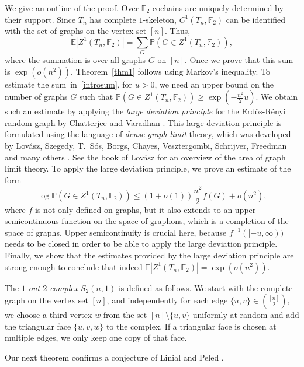 \documentclass[11pt,a4paper]{article}
\theoremstyle{plain}
\theoremstyle{definition}
\begin{document}
We give an outline of the proof. Over $\mathbb{F}_2$ cochains are uniquely determined by their support. Since $T_n$ has complete $1$-skeleton, $C^1(T_n,\mathbb{F}_2)$ can be identified with the set of graphs on the vertex set $[n]$. Thus,
\begin{equation}\label{introsum}\mathbb{E}|Z^1(T_n,\mathbb{F}_2)|=\sum_G \mathbb{P}(G\in Z^1(T_n,\mathbb{F}_2)),\end{equation}
where the summation is over all graphs $G$ on $[n]$. Once we prove that this sum is $\exp(o(n^2))$, Theorem~\ref{thm1} follows using Markov's inequality. To estimate the sum~in~\eqref{introsum}, for $u>0$, we need an upper bound on the number of graphs $G$ such that $\mathbb{P}(G\in Z^1(T_n,\mathbb{F}_2))\ge \exp\left(-\frac{n^2}2 u\right)$. We obtain such an estimate by applying the \emph{large deviation principle} for the Erd\H{o}s-R\'enyi random graph by Chatterjee and Varadhan \cite{chatterjee2011large}. This large deviation principle is formulated using the language of \emph{dense graph limit} theory, which was developed by  Lov\'asz, Szegedy, T.~S\'os,  Borgs, Chayes, Vesztergombi,  Schrijver, Freedman and many others \cite{dl1,dl2,dl3,dl4,dl5,dl6,dl7,dl8,dl9,dl10}.  See the book of Lov\'asz \cite{lovasz2012large} for an overview of the area of graph limit theory. To apply the large deviation principle, we prove an estimate of the form \[\log \mathbb{P}(G\in Z^1(T_n,\mathbb{F}_2))\le (1+o(1))\frac{n^2}2 f(G)+o(n^2),\]
where $f$ is not only defined on graphs, but it also extends to an upper semicontinuous function on the space of graphons, which is a completion of the space of graphs. Upper semicontinuity is crucial here, because $f^{-1}([-u,\infty))$ needs to be closed in order to be able to apply the large deviation principle. Finally, we show that the estimates provided by the large deviation principle are strong enough to conclude that indeed  $\mathbb{E}|Z^1(T_n,\mathbb{F}_2)|=\exp(o(n^2))$.



The \emph{$1$-out $2$-complex} $S_2(n,1)$ is defined as follows. We start with the complete graph on the vertex set $[n]$, and independently for each edge $\{u,v\}\in {{[n]}\choose{2}}$, we choose a third vertex $w$ from the set $[n]\setminus \{u,v\}$ uniformly at random and add the triangular face $\{u,v,w\}$ to the complex. If a triangular face is chosen at multiple edges, we only keep one copy of that face. 

Our next theorem confirms a conjecture of Linial and Peled \cite[Section 5]{linial2019enumeration}.
\end{document}
